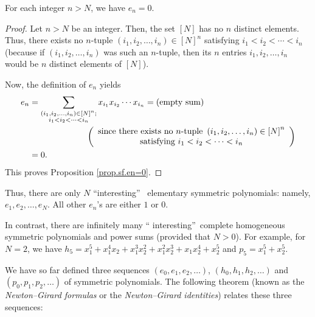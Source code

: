 \begin{proposition}
\label{prop.sf.en=0}For each integer $n>N$, we have $e_{n}=0$.
\end{proposition}

\begin{proof}
Let $n>N$ be an integer. Then, the set $\left[  N\right]  $ has no $n$
distinct elements. Thus, there exists no $n$-tuple $\left(  i_{1},i_{2}%
,\ldots,i_{n}\right)  \in\left[  N\right]  ^{n}$ satisfying $i_{1}%
<i_{2}<\cdots<i_{n}$ (because if $\left(  i_{1},i_{2},\ldots,i_{n}\right)  $
was such an $n$-tuple, then its $n$ entries $i_{1},i_{2},\ldots,i_{n}$ would
be $n$ distinct elements of $\left[  N\right]  $).

Now, the definition of $e_{n}$ yields%
\begin{align*}
e_{n}  &  =\sum_{\substack{\left(  i_{1},i_{2},\ldots,i_{n}\right)  \in\left[
N\right]  ^{n};\\i_{1}<i_{2}<\cdots<i_{n}}}x_{i_{1}}x_{i_{2}}\cdots x_{i_{n}%
}=\left(  \text{empty sum}\right) \\
&  \ \ \ \ \ \ \ \ \ \ \ \ \ \ \ \ \ \ \ \ \left(
\begin{array}
[c]{c}%
\text{since there exists no }n\text{-tuple }\left(  i_{1},i_{2},\ldots
,i_{n}\right)  \in\left[  N\right]  ^{n}\\
\text{satisfying }i_{1}<i_{2}<\cdots<i_{n}%
\end{array}
\right) \\
&  =0.
\end{align*}
This proves Proposition \ref{prop.sf.en=0}.
\end{proof}

Thus, there are only $N$ \textquotedblleft interesting\textquotedblright%
\ elementary symmetric polynomials: namely, $e_{1},e_{2},\ldots,e_{N}$. All
other $e_{n}$'s are either $1$ or $0$.

In contrast, there are infinitely many \textquotedblleft
interesting\textquotedblright\ complete homogeneous symmetric polynomials and
power sums (provided that $N>0$). For example, for $N=2$, we have $h_{5}%
=x_{1}^{5}+x_{1}^{4}x_{2}+x_{1}^{3}x_{2}^{2}+x_{1}^{2}x_{2}^{3}+x_{1}x_{2}%
^{4}+x_{2}^{5}$ and $p_{5}=x_{1}^{5}+x_{2}^{5}$.

We have so far defined three sequences $\left(  e_{0},e_{1},e_{2}%
,\ldots\right)  $, $\left(  h_{0},h_{1},h_{2},\ldots\right)  $ and $\left(
p_{0},p_{1},p_{2},\ldots\right)  $ of symmetric polynomials. The following
theorem (known as the \emph{Newton--Girard formulas} or the
\emph{Newton--Girard identities}) relates these three sequences:

